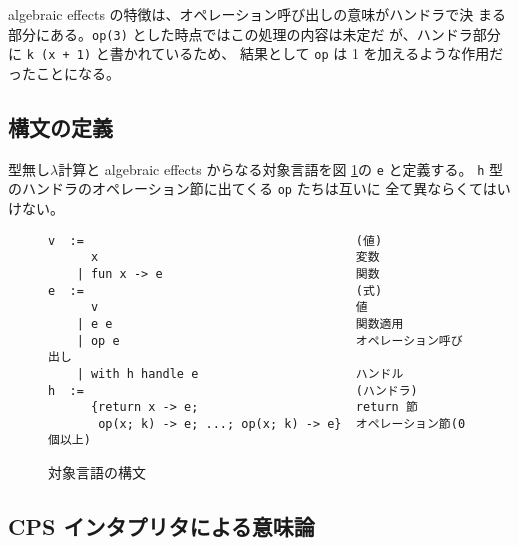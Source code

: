 algebraic effects の特徴は、オペレーション呼び出しの意味がハンドラで決
まる部分にある。\texttt{op(3)} とした時点ではこの処理の内容は未定だ
が、ハンドラ部分に \texttt{k (x + 1)} と書かれているため、
結果として \texttt{op} は 1 を加えるような作用だったことになる。

\subsection{構文の定義}
\label{subsection:syntax}
型無し$\lambda$計算と algebraic effects からなる対象言語を図 \ref{figure:abstract_syntax}の \texttt{e} と定義する。
\texttt{h} 型のハンドラのオペレーション節に出てくる \texttt{op} たちは互いに
全て異ならくてはいけない。


\begin{figure}[t]
\begin{verbatim}
v  :=                                      (値)
      x                                    変数
    | fun x -> e                           関数
e  :=                                      (式)
      v                                    値
    | e e                                  関数適用
    | op e                                 オペレーション呼び出し
    | with h handle e                      ハンドル
h  :=                                      (ハンドラ)
      {return x -> e;                      return 節
       op(x; k) -> e; ...; op(x; k) -> e}  オペレーション節(0個以上)
\end{verbatim}
\caption{対象言語の構文}
\label{figure:abstract_syntax}
\end{figure}



\subsection{CPS インタプリタによる意味論}
\label{subsection:1cps}

